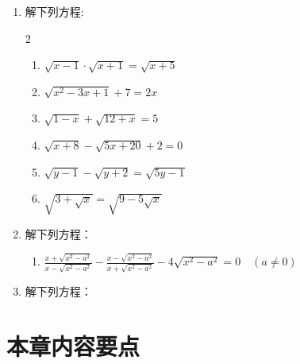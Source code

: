 \begin{enumerate}
\item 解下列方程:
\begin{multicols}{2}
    \begin{enumerate}
\item $\sqrt{x-1} \cdot \sqrt{x+1}=\sqrt{x+5}$
\item $\sqrt{x^{2}-3 x+1}+7=2 x$
\item $\sqrt{1-x}+\sqrt{12+x}=5$
\item $\sqrt{x+8}-\sqrt{5 x+20}+2=0$
\item $\sqrt{y-1}-\sqrt{y+2}=\sqrt{5 y-1}$
\item $\sqrt{3+\sqrt{x}}=\sqrt{9-5 \sqrt{x}}$
\end{enumerate}
\end{multicols}



\item 解下列方程：
\begin{enumerate}
\item  $\frac{x+\sqrt{x^{2}-a^{2}}}{x-\sqrt{x^{2}-a^{2}}}-\frac{x-\sqrt{x^{2}-a^{2}}}{x+\sqrt{x^{2}-a^{2}}}-4 \sqrt{x^{2}-a^{2}}=0\quad (a \neq 0)$
\end{enumerate}

\item 解下列方程：
\begin{enumerate}
\end{enumerate}

\end{enumerate}


\section*{本章内容要点}

